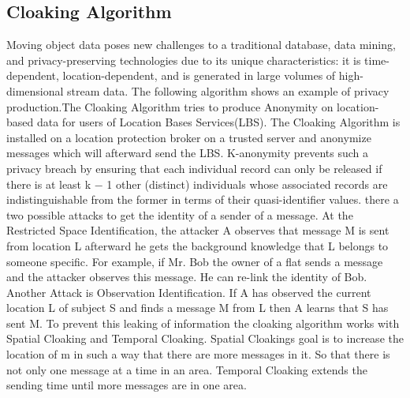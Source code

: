 \documentclass{llncs}
\begin{document}
\subsection{Cloaking Algorithm}
Moving object data poses new challenges to a traditional database, data mining, and privacy-preserving technologies due to its unique characteristics: it is time-dependent, location-dependent, and is generated in large volumes of high-dimensional stream data. The following algorithm shows an example of privacy production.The Cloaking Algorithm tries to produce Anonymity on location-based data for users of Location Bases Services(LBS). The Cloaking Algorithm is installed on a location protection broker on a trusted server and anonymize messages which will afterward send the LBS. K-anonymity prevents such a privacy breach by ensuring that each individual record can only be released if there is at least k − 1 other (distinct) individuals whose associated records are indistinguishable from the former in terms of their quasi-identifier values. there a two possible attacks to get the identity of a sender of a message. At the  Restricted Space Identification, the attacker A observes that message M is sent from location L afterward he gets the background knowledge that L belongs to someone specific. For example, if Mr. Bob the owner of a flat sends a message and the attacker observes this message. He can re-link the identity of Bob. Another Attack is  Observation Identiﬁcation. If A has observed the current location L of subject S and ﬁnds a message M from L then A learns that S has sent M.  To prevent this leaking of information the cloaking algorithm works with Spatial Cloaking and Temporal Cloaking. Spatial Cloakings goal is to increase the location of m in such a way that there are more messages in it. So that there is not only one message at a time in an area. Temporal Cloaking extends the sending time until more messages are in one area. 


\end{document}
